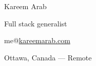 \documentclass[9pt]{article}
\begin{document}
    \begin{changemargin}{2cm}{-2cm}
        \begin{center}
        {\huge Kareem Arab}\par\smallskip\smallskip

        \begin{minipage}[b]{0.33333\textwidth}
        \centering
            Full stack generalist \par
            me@\href{http://kareemarab.com}{kareemarab.com} \par
            Ottawa, Canada --- Remote\par
        \end{minipage}
        \end{center}
    \end{changemargin}
\end{document}
